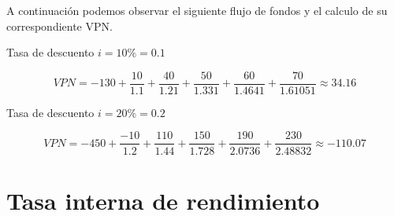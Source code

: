 A continuación podemos observar el siguiente flujo de fondos y el calculo de su correspondiente VPN.
\begin{example} Tasa de descuento $i=10\%=0.1$ 

    \[VPN=-130+\frac{10}{1.1}+\frac{40}{1.21}+\frac{50}{1.331}+\frac{60}{1.4641}+\frac{70}{1.61051}\approx34.16\]
\end{example}
\begin{example} Tasa de descuento $i=20\%=0.2$
        
    \[VPN=-450+\frac{-10}{1.2}+\frac{110}{1.44}+\frac{150}{1.728}+\frac{190}{2.0736}+\frac{230}{2.48832}\approx-110.07\]
\end{example}
\section{Tasa interna de rendimiento}